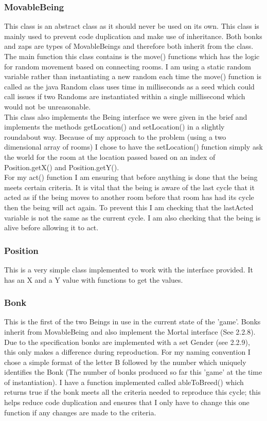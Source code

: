 \documentclass[12pt]{article}
\begin{document}
\subsubsection{MovableBeing}
This class is an abstract class as it should never be used on its own. This class is mainly used to prevent code duplication and make use of inheritance. Both bonks and zaps are types of MovableBeings and therefore both inherit from the class. The main function this class contains is the move() functions which has the logic for random movement based on connecting rooms. I am using a static random variable rather than instantiating a new random each time the move() function is called as the java Random class uses time in milliseconds as a seed which could call issues if two Randoms are instantiated within a single millisecond which would not be unreasonable. \\

This class also implements the Being interface we were given in the brief and implements the methods getLocation() and setLocation() in a slightly roundabout way. Because of my approach to the problem (using a two dimensional array of rooms) I chose to have the setLocation() function simply ask the world for the room at the location passed based on an index of Position.getX() and Position.getY().\\

For my act() function I am ensuring that before anything is done that the being meets certain criteria. It is vital that the being is aware of the last cycle that it acted as if the being moves to another room before that room has had its cycle then the being will act again. To prevent this I am checking that the lastActed variable is not the same as the current cycle. I am also checking that the being is alive before allowing it to act. 
\subsubsection{Position}
This is a very simple class implemented to work with the interface provided. It has an X and a Y value with functions to get the values.
\subsubsection{Bonk}
This is the first of the two Beings in use in the current state of the 'game'. Bonks inherit from MovableBeing and also implement the Mortal interface (See 2.2.8). Due to the specification bonks are implemented with a set Gender (see 2.2.9), this only makes a difference during reproduction. For my naming convention I chose a simple format of the letter B followed by the number which uniquely identifies the Bonk (The number of bonks produced so far this 'game' at the time of instantiation). I have a function implemented called ableToBreed() which returns true if the bonk meets all the criteria needed to reproduce this cycle; this helps reduce code duplication and ensures that I only have to change this one function if any changes are made to the criteria.
\end{document}
